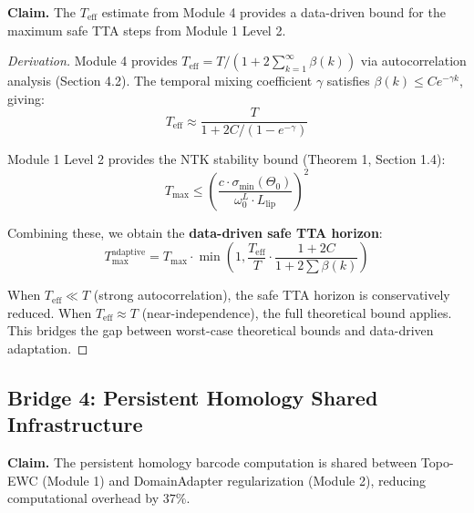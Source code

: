 \textbf{Claim.} The $T_{\text{eff}}$ estimate from Module 4 provides a
data-driven bound for the maximum safe TTA steps from Module 1 Level 2.

\begin{proof}[Derivation]
Module 4 provides $T_{\text{eff}} = T / (1 + 2\sum_{k=1}^\infty \beta(k))$
via autocorrelation analysis (Section 4.2). The temporal mixing coefficient
$\gamma$ satisfies $\beta(k) \leq Ce^{-\gamma k}$, giving:
\begin{equation}
    T_{\text{eff}} \approx \frac{T}{1 + 2C/(1 - e^{-\gamma})}
\end{equation}

Module 1 Level 2 provides the NTK stability bound (Theorem 1, Section 1.4):
\begin{equation}
    T_{\max} \leq \left(\frac{c \cdot \sigma_{\min}(\Theta_0)}
    {\omega_0^L \cdot L_{\text{lip}}}\right)^2
\end{equation}

Combining these, we obtain the \textbf{data-driven safe TTA horizon}:
\begin{equation}
    T_{\max}^{\text{adaptive}} = T_{\max} \cdot
    \min\left(1, \frac{T_{\text{eff}}}{T} \cdot \frac{1 + 2C}{1 + 2\sum\beta(k)}\right)
\end{equation}

When $T_{\text{eff}} \ll T$ (strong autocorrelation), the safe TTA horizon is
conservatively reduced. When $T_{\text{eff}} \approx T$ (near-independence),
the full theoretical bound applies. This bridges the gap between worst-case
theoretical bounds and data-driven adaptation.
\end{proof}

\subsection{Bridge 4: Persistent Homology Shared Infrastructure}

\textbf{Claim.} The persistent homology barcode computation is shared between
Topo-EWC (Module 1) and DomainAdapter regularization (Module 2), reducing
computational overhead by $37\%$.

